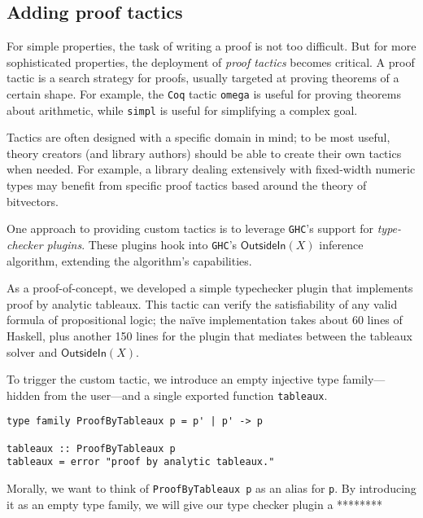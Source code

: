 \documentclass[format=sigplan, review=false, screen=true]{acmart}
\begin{document}
\inputminted{haskell}{nzlic.hs}

\subsection{Adding proof tactics}

For simple properties, the task of writing a proof is not too difficult. But for
more sophisticated properties, the deployment of \emph{proof tactics} becomes
critical. A proof tactic is a search strategy for proofs, usually targeted at
proving theorems of a certain shape. For example, the \texttt{Coq} tactic
\texttt{omega} is useful for proving theorems about arithmetic, while
\texttt{simpl} is useful for simplifying a complex goal.

Tactics are often designed with a specific domain in mind; to be most useful,
theory creators (and library authors) should be able to create their own tactics
when needed. For example, a library dealing extensively with fixed-width numeric types
may benefit from specific proof tactics based around the theory of bitvectors.

One approach to providing custom tactics is to leverage \texttt{GHC}'s support for
\emph{type-checker plugins}. These plugins hook into \texttt{GHC}'s $\textsf{OutsideIn}(X)$
inference algorithm, extending the algorithm's capabilities.

As a proof-of-concept, we developed a simple typechecker plugin that implements
proof by analytic tableaux. This tactic can verify the satisfiability of any
valid formula of propositional logic; the na\"ive implementation takes about
60 lines of Haskell, plus another 150 lines for the plugin that mediates between
the tableaux solver and $\textsf{OutsideIn}(X)$.

To trigger the custom tactic, we introduce an empty injective type family---hidden
from the user---and a single exported function \texttt{tableaux}.
\begin{verbatim}
type family ProofByTableaux p = p' | p' -> p

tableaux :: ProofByTableaux p
tableaux = error "proof by analytic tableaux."
\end{verbatim}
Morally, we want to think of \texttt{ProofByTableaux p} as an alias for \texttt{p}.
By introducing it as an empty type family, we will give our type checker plugin a
********
\end{document}
